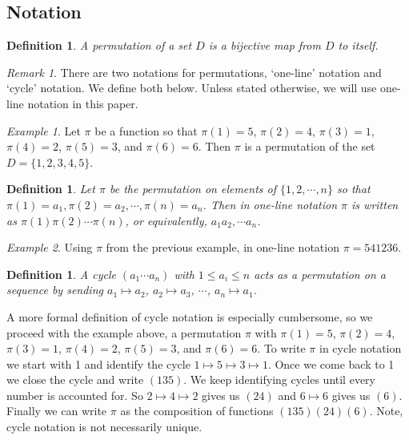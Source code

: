 \documentclass[11pt,letterpaper,twoside,english]{article}
\theoremstyle{theorem}
\newtheorem{definition}[theorem]{Definition}
\theoremstyle{remark}
\newtheorem{remark}{Remark}
\newtheorem{example}{Example}
\begin{document}
\subsection{Notation}

\begin{definition}
A permutation of a set $D$ is a bijective map from $D$ to itself. 
\end{definition}


\begin{remark}
There are two notations for permutations, `one-line' notation and `cycle' notation. We define both below. Unless stated otherwise, we will use one-line notation in this paper.
\end{remark}

\begin{example}
Let $\pi$ be a function so that $\pi(1)=5$, $\pi(2)=4$, $\pi(3)=1$, $\pi(4)=2$, $\pi(5)=3$, and $\pi(6)=6$. Then $\pi$ is a permutation of the set $D=\{1,2,3,4,5\}$. 
\end{example}

\begin{definition}
Let $\pi$ be the permutation on elements of $\{1,2,\cdots, n\}$ so that $\pi(1)=a_1, \pi(2)=a_2,\cdots, \pi(n)=a_n$. Then in one-line notation $\pi$ is written as $\pi(1)\pi(2)\cdots\pi(n)$, or equivalently, $a_1a_2,\cdots a_n$. 
\end{definition}

\begin{example}
Using $\pi$ from the previous example, in one-line notation $\pi=541236$.
\end{example}

\begin{definition}
A cycle $(a_1\cdots a_n)$ with $1\le a_i\le n$ acts as a permutation on a sequence by sending $a_1\mapsto a_2$, $a_2\mapsto a_3$, $\cdots$, $a_n\mapsto a_1$.
\end{definition}

A more formal definition of cycle notation is especially cumbersome, so we proceed with the example above, a permutation $\pi$ with $\pi(1)=5$, $\pi(2)=4$, $\pi(3)=1$, $\pi(4)=2$, $\pi(5)=3$, and $\pi(6)=6$. To write $\pi$ in cycle notation we start with 1 and identify the cycle $1\mapsto 5\mapsto 3\mapsto 1$. Once we come back to 1 we close the cycle and write $(135)$. We keep identifying cycles until every number is accounted for. So $2\mapsto 4\mapsto 2$ gives us $(24)$ and $6\mapsto 6$ gives us $(6)$. Finally we can write $\pi$ as the composition of functions $(135)(24)(6)$. Note, cycle notation is not necessarily unique. 
\end{document}
